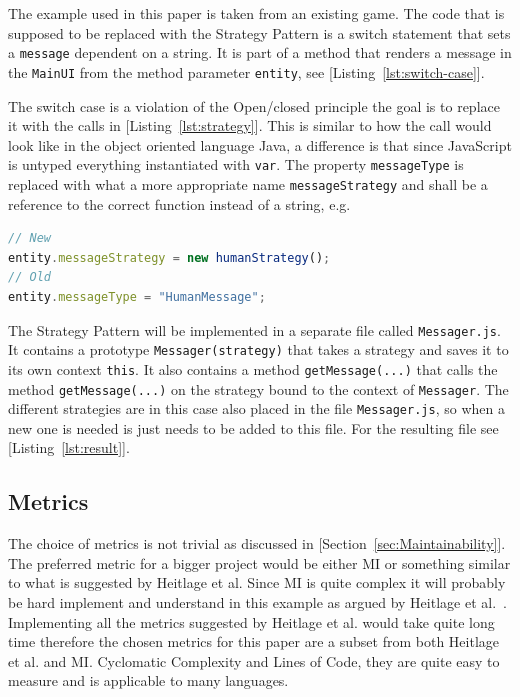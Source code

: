 \documentclass[conference, a4paper]{IEEEtran}
\begin{document}
The example used in this paper is taken from an existing game. The code that is supposed to be replaced with the Strategy Pattern is a switch statement that sets a \texttt{message} dependent on a string. It is part of a method that renders a message in the \texttt{MainUI} from the method parameter \texttt{entity}, see [Listing~\ref{lst:switch-case}].

The switch case is a violation of the Open/closed principle the goal is to replace it with the calls in [Listing~\ref{lst:strategy}]. This is similar to how the call would look like in the object oriented language Java, a difference is that since JavaScript is untyped everything instantiated with \texttt{var}. The property \texttt{messageType} is replaced with what a more appropriate name \texttt{messageStrategy} and shall be a reference to the correct function instead of a string, e.g.

\begin{lstlisting}[language=JavaScript]
// New
entity.messageStrategy = new humanStrategy();
// Old
entity.messageType = "HumanMessage";
\end{lstlisting}

The Strategy Pattern will be implemented in a separate file called \texttt{Messager.js}. It contains a prototype \texttt{Messager(strategy)} that takes a strategy and saves it to its own context \texttt{this}. It also contains a method \texttt{getMessage(...)} that calls the method \texttt{getMessage(...)} on the strategy bound to the context of \texttt{Messager}. The different strategies are in this case also placed in the file \texttt{Messager.js}, so when a new one is needed is just needs to be added to this file. For the resulting file see [Listing~\ref{lst:result}].

\subsection{Metrics}
The choice of metrics is not trivial as discussed in [Section~\ref{sec:Maintainability}]. The preferred metric for a bigger project would be either MI or something similar to what is suggested by Heitlage et al. Since MI is quite complex it will probably be hard implement and understand in this example as argued by Heitlage et al.~\cite{bibitem:Maintainability}. Implementing all the metrics suggested by Heitlage et al. would take quite long time therefore the chosen metrics for this paper are a subset from both Heitlage et al. and MI. Cyclomatic Complexity and Lines of Code, they are quite easy to measure and is applicable to many languages.
\end{document}
